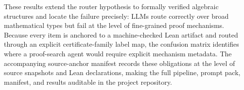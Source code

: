 \documentclass[11pt]{article}
\begin{document}
These results extend the router hypothesis to formally verified algebraic
structures and locate the failure precisely: LLMs route correctly over broad
mathematical types but fail at the level of fine-grained proof mechanisms.
Because every item is anchored to a machine-checked Lean artifact and routed
through an explicit certificate-family label map, the confusion matrix
identifies where a proof-search agent would require explicit mechanism
metadata.
The accompanying source-anchor manifest records these obligations at the
level of source snapshots and Lean declarations, making the full pipeline,
prompt pack, manifest, and results auditable in the project repository.



\end{document}
